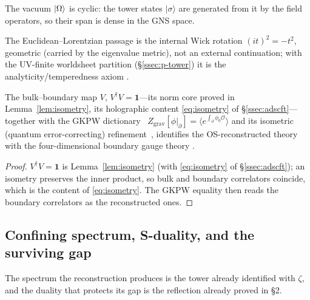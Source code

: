 \begin{corollary}\label{cor:cyclic}
The vacuum $\lvert\Omega\rangle$ is cyclic: the tower states $\lvert\sigma\rangle$ are generated from
it by the field operators, so their span is dense in the GNS space.

\end{corollary}

\begin{remark}[Analyticity (OS0)]\label{rmk:os0}
The Euclidean--Lorentzian passage is the internal Wick rotation $(it)^2=-t^2$, geometric (carried
by the eigenvalue metric), not an external continuation; with the UV-finite worldsheet partition
(\S\ref*{ssec:p-tower}) it is the analyticity/temperedness axiom .
\end{remark}

\begin{theorem}\label{thm:isometry}
The bulk--boundary map $V$, $V^{\dagger}V=\mathbf1$---its norm core proved in Lemma~\ref{lem:isometry}, its holographic content \eqref{eq:isometry} of \S\ref{ssec:adscft}---together with the GKPW dictionary~\cite{Maldacena98,GKP98,Witten98}
$Z_{\mathrm{grav}}[\phi|_\partial]=\langle e^{\int_\partial\phi_0\mathcal O}\rangle$ and its isometric (quantum error-correcting) refinement~\cite{AlmheiriDongHarlow}, identifies the OS-reconstructed theory with the four-dimensional boundary
gauge theory .
\end{theorem}
\begin{proof}
$V^{\dagger}V=\mathbf1$ is Lemma~\ref{lem:isometry} (with \eqref{eq:isometry} of \S\ref{ssec:adscft}); an isometry preserves the inner product, so
bulk and boundary correlators coincide, which is the content of \eqref{eq:isometry}. The GKPW
equality then reads the boundary correlators as the reconstructed ones.
\end{proof}

\subsection{Confining spectrum, S-duality, and the surviving gap}\label{ssec:zeta-gap}
The spectrum the reconstruction produces is the tower already identified with $\zeta$, and the
duality that protects its gap is the reflection already proved in \S2.

